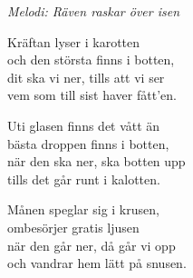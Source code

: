 {\footnotesize\textit{Melodi: Räven raskar över isen}}\par
\vspace{10pt}
Kräftan lyser i karotten\\
och den största finns i botten,\\
dit ska vi ner, tills att vi ser\\
vem som till sist haver fått'en.\par
\vspace{10pt}
Uti glasen finns det vått än\\
bästa droppen finns i botten,\\
när den ska ner, ska botten upp\\
tills det går runt i kalotten.\par
\vspace{10pt}
Månen speglar sig i krusen,\\
ombesörjer gratis ljusen\\
när den går ner, då går vi opp\\
och vandrar hem lätt på snusen.
